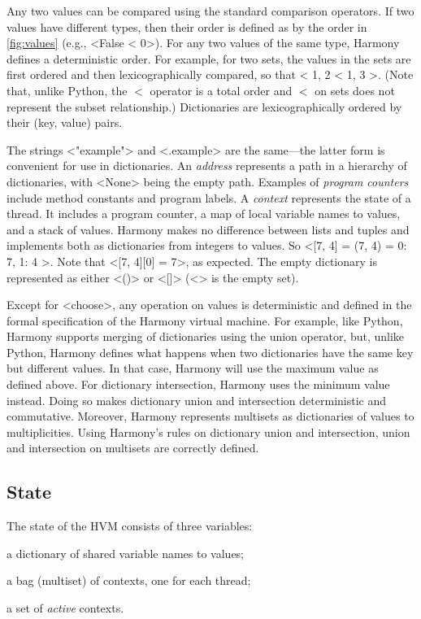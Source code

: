 \documentclass[twocolumn]{article}
\begin{document}
Any two values can be compared using the standard comparison operators.
If two values have different types, then their order is defined as by
the order in \autoref{fig:values} (e.g., <{False < 0}>).
For any two values of the same type, Harmony defines a deterministic order.
For example, for two sets, the values in the sets are first ordered and
then lexicographically compared, so that <{{ 1, 2 } < { 1, 3 }}>.
(Note that, unlike Python, the $<$ operator is a total order and
$<$ on sets does not represent the subset relationship.)
Dictionaries are lexicographically ordered by their (key, value) pairs.

The strings <{"example"}> and <{.example}> are the same---the latter
form is convenient for use in dictionaries.
An \emph{address} represents a path in a hierarchy of dictionaries, with
<{None}> being the empty path.
Examples of \emph{program counters} include method constants and program labels.
A \emph{context} represents the state of a thread.  It includes a program
counter, a map of local variable names to values, and a stack of values.
Harmony makes no difference between lists and tuples and implements
both as dictionaries from integers to values.
So <{[7, 4] = (7, 4) = { 0: 7, 1: 4 }}>.
Note that <{[7, 4][0] = 7}>, as expected.
The empty dictionary is represented as either <{()}> or <{[]}>
(<{{}}> is the empty set).

Except for <{choose}>, any operation on values is deterministic and
defined in the formal specification of the Harmony virtual machine.
For example, like Python, Harmony supports merging of dictionaries
using the union operator, but, unlike Python, Harmony defines
what happens when two dictionaries have the same key but different values.
In that case, Harmony will use the maximum value as defined above.
For dictionary  intersection, Harmony uses the minimum value instead.
Doing so makes dictionary union and intersection deterministic and
commutative.  Moreover, Harmony represents multisets as dictionaries
of values to multiplicities.  Using Harmony's rules on dictionary union
and intersection, union and intersection on multisets are correctly
defined.

\subsection{State}

The state of the HVM consists of three variables:
\begin{compactitem}
\item a dictionary of shared variable names to values;
\item a bag (multiset) of contexts, one for each thread;
\item a set of \emph{active} contexts.
\end{compactitem}
\end{document}
